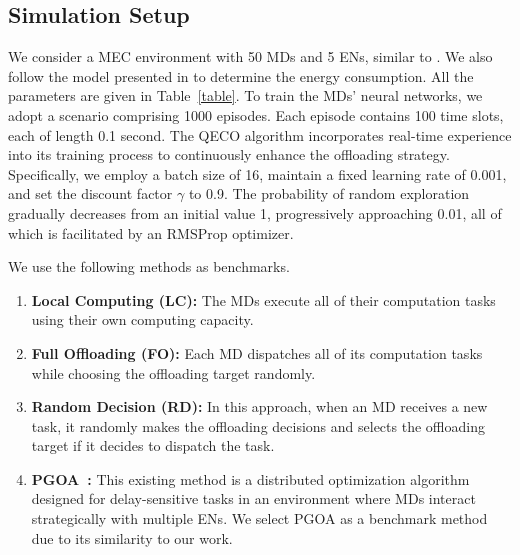 \documentclass[12pt,draftclsnofoot,onecolumn]{IEEEtran}
\begin{document}
\subsection{Simulation Setup}
We consider a MEC environment with 50 MDs and 5 ENs, similar to \cite{9253665}. We also follow the model presented in \cite{zhou2021deep} to determine the energy consumption. All the parameters are given in Table~\ref{table}. To train the MDs' neural networks, we adopt a scenario comprising 1000 episodes. Each episode contains 100 time slots, each of length 0.1 second. The QECO algorithm incorporates real-time experience into its training process to continuously enhance the offloading strategy. Specifically, we employ a batch size of 16, maintain a fixed learning rate of 0.001, and set the discount factor $\gamma$ to 0.9. The probability of random exploration gradually decreases from an initial value 1, progressively approaching 0.01, all of which is facilitated by an RMSProp optimizer. %




We use the following methods as benchmarks.
\begin{enumerate}
	
	\item \textbf{Local Computing (LC):} The MDs execute all of their computation tasks using their own computing capacity.
	
	\item \textbf{Full Offloading (FO):} Each MD dispatches all of its computation tasks while choosing the offloading target randomly. %
	
	\item \textbf{Random Decision (RD):} In this approach, when an MD receives a new task, it randomly makes the offloading decisions and selects the offloading target if it decides to dispatch the task. %
	
	\item \textbf{PGOA~\cite{yang2018distributed}:} This existing method is a distributed optimization algorithm designed for delay-sensitive tasks in an environment where MDs interact strategically with multiple ENs. We select PGOA as a benchmark method due to its similarity to our work.
\end{enumerate}
\end{document}
